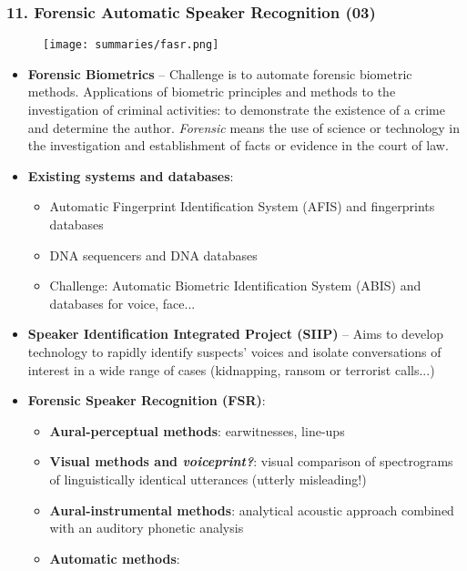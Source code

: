 \documentclass[a4paper]{article}
\begin{document}
    \subsubsection*{11. Forensic Automatic Speaker Recognition (03)}
      \begin{figure}[htp]
        \centering
          \texttt{[image: summaries/fasr.png]}
      \end{figure}
      \begin{itemize}
        \item \textbf{Forensic Biometrics} -- Challenge is to automate forensic biometric methods. Applications of biometric principles and methods to the investigation of criminal activities: to demonstrate the existence of a crime and determine the author. \emph{Forensic} means the use of science or technology in the investigation and establishment of facts or evidence in the court of law.
        \item \textbf{Existing systems and databases}:
        \begin{itemize}
          \item Automatic Fingerprint Identification System (AFIS) and fingerprints databases
          \item DNA sequencers and DNA databases
          \item Challenge: Automatic Biometric Identification System (ABIS) and databases for voice, face...
        \end{itemize}
        \item \textbf{Speaker Identification Integrated Project (SIIP)} -- Aims to develop technology to rapidly identify suspects' voices and isolate conversations of interest in a wide range of cases (kidnapping, ransom or terrorist calls...)
        \item \textbf{Forensic Speaker Recognition (FSR)}:
        \begin{itemize}
          \item \textbf{Aural-perceptual methods}: earwitnesses, line-ups
          \item \textbf{Visual methods and \emph{voiceprint?}}: visual comparison of spectrograms of linguistically identical utterances (utterly misleading!)
          \item \textbf{Aural-instrumental methods}: analytical acoustic approach combined with an auditory phonetic analysis
          \item \textbf{Automatic methods}:

\end{itemize}
\end{itemize}
\end{document}
